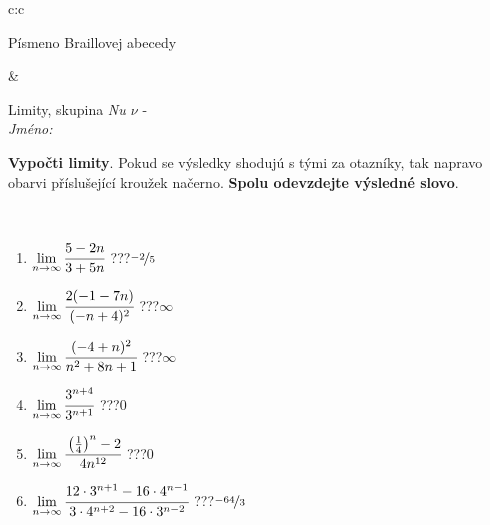 \documentclass[10pt]{report}
\begin{document}
\begin{tabular}{c:c}
\begin{minipage}[c][104.5mm][t]{0.5\linewidth}
\begin{center}
\begin{minipage}{0.20\linewidth}
\begin{center}
{\small Písmeno Braillovej abecedy}
\end{center}
\end{minipage}
\end{center}
\end{minipage}
&
\begin{minipage}[c][104.5mm][t]{0.5\linewidth}
\begin{center}
\vspace{7mm}
{\huge Limity, skupina \textit{Nu $\nu$} -}\\[5mm]
\textit{Jméno:}\phantom{xxxxxxxxxxxxxxxxxxxxxxxxxxxxxxxxxxxxxxxxxxxxxxxxxxxxxxxxxxxxxxxxx}\\[5mm]
\begin{minipage}{0.95\linewidth}
\begin{center}
\textbf{Vypočti limity}. Pokud se výsledky shodujú s tými za otazníky, tak napravo\\obarvi příslušející kroužek načerno. \textbf{Spolu odevzdejte výsledné slovo}.
\end{center}
\end{minipage}
\\[1mm]
\begin{minipage}{0.79\linewidth}
\begin{center}
\begin{varwidth}{\linewidth}
\begin{enumerate}
\normalsize
\item $\lim\limits_{n\to\infty}\cfrac{5-2n}{3+5n}$\quad \dotfill\; ???\;\dotfill \quad $\nicefrac{-2}{5}$
\item $\lim\limits_{n\to\infty}\cfrac{2(-1-7n)}{(-n+4)^2}$\quad \dotfill\; ???\;\dotfill \quad $\infty$
\item $\lim\limits_{n\to\infty}\cfrac{(-4+n)^2}{n^2+8n+1}$\quad \dotfill\; ???\;\dotfill \quad $\infty$
\item $\lim\limits_{n\to\infty}\cfrac{3^{n+4}}{3^{n+1}}$\quad \dotfill\; ???\;\dotfill \quad $0$
\item $\lim\limits_{n\to\infty}\cfrac{\left(\frac{1}{4}\right)^n -2}{4n^{12}}$\quad \dotfill\; ???\;\dotfill \quad $0$
\item $\lim\limits_{n\to\infty}\cfrac{12\cdot 3^{n+1}-16\cdot 4^{n-1}}{3\cdot 4^{n+2}-16\cdot 3^{n-2}}$\quad \dotfill\; ???\;\dotfill \quad $\nicefrac{-64}{3}$
\end{enumerate}
\end{varwidth}
\end{center}
\end{minipage}
\begin{minipage}{0.20\linewidth}

\end{minipage}
\end{center}
\end{minipage}
\end{tabular}
\end{document}
